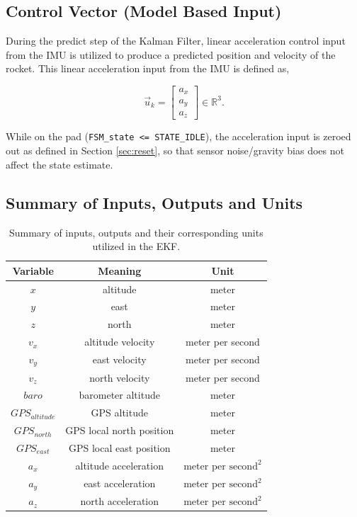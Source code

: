 \documentclass{article}
\begin{document}
\subsection{Control Vector (Model Based Input)}

During the predict step of the Kalman Filter, linear acceleration control input from the IMU is utilized to produce a predicted position and velocity of the rocket. This linear acceleration input from the IMU is defined as, 

\begin{equation}
   \vec{u}_k =
\begin{bmatrix}
a_x \\ a_y \\ a_z
\end{bmatrix} \in \mathbb{R}^3 . 
\end{equation}



While on the pad (\texttt{FSM\_state <= STATE\_IDLE}), the acceleration input is zeroed out as defined in Section \ref{sec:reset}, so that sensor noise/gravity bias does not affect  the state estimate.
\newpage
\subsection{Summary of Inputs, Outputs and Units}
\begin{table}[h!]
    \centering
    \begin{tabular}{|c|c|c|}
        \hline
         Variable & Meaning & Unit \\
         \hline
         $x$ & altitude & meter \\ 
         $y$ & east & meter \\ 
         $z$ & north & meter \\ 
         $v_x$ & altitude velocity & meter per second \\ 
         $v_y$ & east velocity & meter per second \\ 
         $v_z$ & north velocity & meter per second \\
         $baro$ & barometer altitude & meter \\ 
         $GPS_{altitude}$ & GPS altitude & meter  \\ 
         $GPS_{north}$ & GPS local north position & meter \\
         $GPS_{east}$ & GPS local east position & meter \\
         $a_x$ & altitude acceleration & meter per $\text{second}^2$ \\ 
         $a_y$ & east acceleration & meter per $\text{second}^2$ \\ 
         $a_z$ & north acceleration & meter per $\text{second}^2$ \\
        \hline
    \end{tabular}
    \caption{Summary of inputs, outputs and their corresponding units utilized in the EKF.}
    \label{tab:placeholder}
\end{table}
\end{document}
